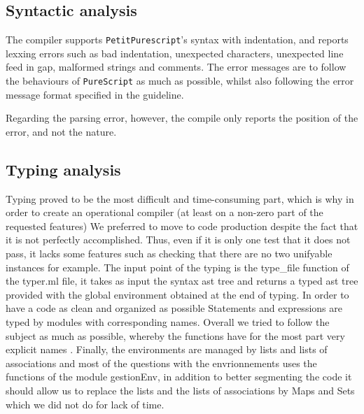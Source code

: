 \documentclass{amsart}
\begin{document}
	\subsection{Syntactic analysis}
	
	The compiler supports \texttt{PetitPurescript}'s syntax with indentation, and reports lexxing errors such as bad indentation, unexpected characters, unexpected line feed in gap, malformed strings and comments. The error messages are to follow the behaviours of \texttt{PureScript} as much as possible, whilst also following the error message format specified in the guideline.
	
	Regarding the parsing error, however, the compile only reports the position of the error, and not the nature.
	
	\subsection{Typing analysis}
	Typing proved to be the most difficult and time-consuming part, which is why in order to create an operational compiler (at least on a non-zero part of the requested features) We preferred to move to code production despite the fact that it is not perfectly accomplished. Thus, even if it is only one test that it does not pass, it lacks some features such as checking that there are no two unifyable instances for example. The input point of the typing is the type\_file function of the typer.ml file, it takes as input the syntax ast tree and returns a typed ast tree provided with the global environment obtained at the end of typing. In order to have a code as clean and organized as possible Statements and expressions are typed by modules with corresponding names. Overall we tried to follow the subject as much as possible, whereby the functions have for the most part very explicit names . Finally, the environments are managed by lists and lists of associations and most of the questions with the envrionnements uses the functions of the module gestionEnv, in addition to better segmenting the code it should allow us to replace the lists and the lists of associations by Maps and Sets which we did not do for lack of time.	
	
\end{document}

